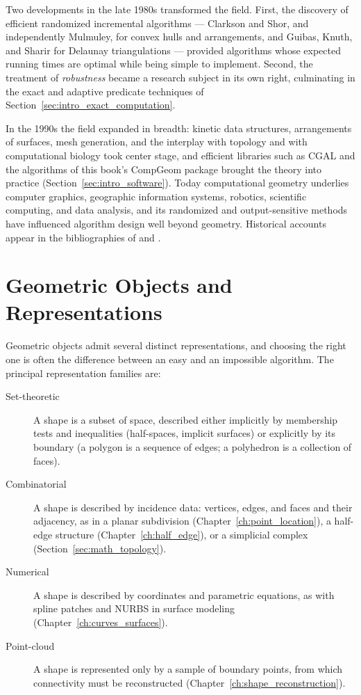 Two developments in the late 1980s transformed the field. First, the
discovery of efficient randomized incremental algorithms --- Clarkson and
Shor, and independently Mulmuley, for convex hulls and arrangements, and
Guibas, Knuth, and Sharir for Delaunay triangulations \cite{guibas1992} ---
provided algorithms whose expected running times are optimal while being
simple to implement. Second, the treatment of \emph{robustness} became a
research subject in its own right, culminating in the exact and adaptive
predicate techniques of Section~\ref{sec:intro_exact_computation}.

In the 1990s the field expanded in breadth: kinetic data structures,
arrangements of surfaces, mesh generation, and the interplay with
topology and with computational biology took center stage, and efficient
libraries such as CGAL and the algorithms of this book's CompGeom package
brought the theory into practice (Section~\ref{sec:intro_software}). Today
computational geometry underlies computer graphics, geographic information
systems, robotics, scientific computing, and data analysis, and its
randomized and output-sensitive methods have influenced algorithm design
well beyond geometry. Historical accounts appear in the bibliographies of
\cite{preparata1985} and \cite{deberg2008}.


\section{Geometric Objects and Representations}
\label{sec:intro_objects_representations}

Geometric objects admit several distinct representations, and choosing the
right one is often the difference between an easy and an impossible
algorithm. The principal representation families are:

\begin{description}
  \item[Set-theoretic] A shape is a subset of space, described either
    implicitly by membership tests and inequalities (half-spaces,
    implicit surfaces) or explicitly by its boundary (a polygon is a
    sequence of edges; a polyhedron is a collection of faces).
  \item[Combinatorial] A shape is described by incidence data: vertices,
    edges, and faces and their adjacency, as in a planar subdivision
    (Chapter~\ref{ch:point_location}), a half-edge structure
    (Chapter~\ref{ch:half_edge}), or a simplicial complex
    (Section~\ref{sec:math_topology}).
  \item[Numerical] A shape is described by coordinates and parametric
    equations, as with spline patches and NURBS in surface modeling
    (Chapter~\ref{ch:curves_surfaces}).
  \item[Point-cloud] A shape is represented only by a sample of boundary
    points, from which connectivity must be reconstructed
    (Chapter~\ref{ch:shape_reconstruction}).
\end{description}

